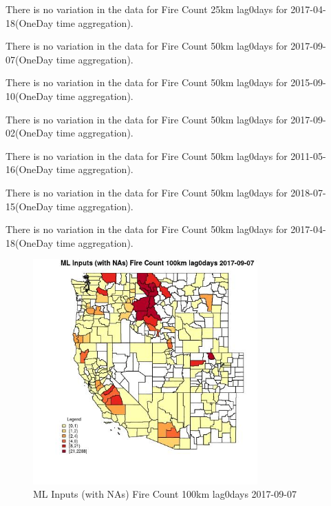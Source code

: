 There is no variation in the data for Fire Count 25km lag0days for 2017-04-18(OneDay time aggregation). 
 

There is no variation in the data for Fire Count 50km lag0days for 2017-09-07(OneDay time aggregation). 
 

There is no variation in the data for Fire Count 50km lag0days for 2015-09-10(OneDay time aggregation). 
 

There is no variation in the data for Fire Count 50km lag0days for 2017-09-02(OneDay time aggregation). 
 

There is no variation in the data for Fire Count 50km lag0days for 2011-05-16(OneDay time aggregation). 
 

There is no variation in the data for Fire Count 50km lag0days for 2018-07-15(OneDay time aggregation). 
 

There is no variation in the data for Fire Count 50km lag0days for 2017-04-18(OneDay time aggregation). 
 

\begin{figure} 
\centering  
\includegraphics[width=0.77\textwidth]{Code_Outputs/Report_ML_input_PM25_Step4_part_e_de_duplicated_aves_compiled_2019-05-21wNAs_CountyFire_Count_100km_lag0daysMean2017-09-07.jpg} 
\caption{\label{fig:Report_ML_input_PM25_Step4_part_e_de_duplicated_aves_compiled_2019-05-21wNAsCountyFire_Count_100km_lag0daysMean2017-09-07}ML Inputs (with NAs) Fire Count 100km lag0days 2017-09-07} 
\end{figure} 
 

